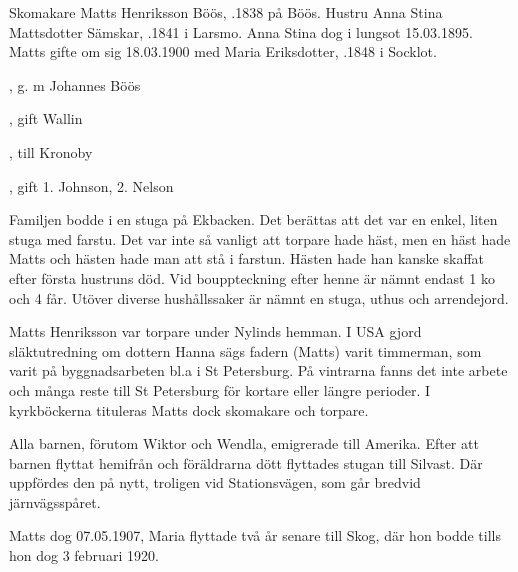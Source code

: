 Skomakare Matts Henriksson Böös, .1838 på Böös. Hustru Anna Stina Mattsdotter Sämskar, .1841 i Larsmo. Anna Stina dog i lungsot 15.03.1895. Matts gifte om sig 18.03.1900 med Maria Eriksdotter, .1848 i Socklot.
\begin{jhchildren}
  \item {}
  \item {}, g. m Johannes Böös
  \item {}, gift Wallin
  \item {}
  \item {}, till Kronoby
  \item {}
  \item {}, gift 1. Johnson, 2. Nelson
\end{jhchildren}
Familjen bodde i en stuga på Ekbacken. Det berättas att det var en enkel, liten stuga med farstu. Det var inte så vanligt att torpare hade häst, men en häst hade Matts och hästen hade man att stå i farstun. Hästen hade han kanske skaffat efter första hustruns död. Vid bouppteckning efter henne är nämnt endast 1 ko och 4 får. Utöver diverse hushållssaker är nämnt en stuga, uthus och arrendejord.

Matts Henriksson var torpare under Nylinds hemman. I USA gjord släktutredning om dottern Hanna sägs fadern (Matts) varit timmerman, som varit på byggnadsarbeten bl.a i St Petersburg. På vintrarna fanns det inte arbete och många reste till St Petersburg för kortare eller längre perioder. I kyrkböckerna tituleras Matts dock skomakare och torpare.

Alla barnen, förutom Wiktor och Wendla, emigrerade till Amerika. Efter att barnen flyttat hemifrån och föräldrarna dött flyttades stugan till Silvast. Där uppfördes den på nytt, troligen vid Stationsvägen, som går bredvid järnvägsspåret.

Matts dog 07.05.1907, Maria flyttade två år senare till Skog, där hon bodde tills hon dog 3 februari 1920.


